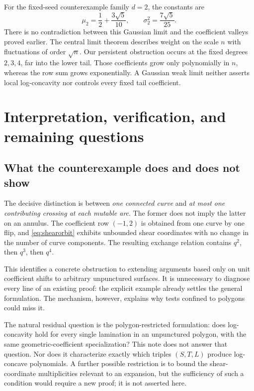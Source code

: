 \documentclass[11pt,letterpaper]{article}
\numberwithin{equation}{section}
\theoremstyle{definition}
\begin{document}
For the fixed-seed counterexample family $d=2$, the constants are
\[
 \mu_2=\frac12+\frac{3\sqrt5}{10},\qquad
 \sigma_2^2=\frac{7\sqrt5}{25}.
\]
There is no contradiction between this Gaussian limit and the coefficient
valleys proved earlier. The central limit theorem describes weight on the
scale $n$ with fluctuations of order $\sqrt n$. Our persistent obstruction
occurs at the fixed degrees $2,3,4$, far into the lower tail. Those
coefficients grow only polynomially in $n$, whereas the row sum grows
exponentially. A Gaussian weak limit neither asserts local log-concavity nor
controls every fixed tail coefficient.

\section{Interpretation, verification, and remaining questions}\label{sec:scope}

\subsection{What the counterexample does and does not show}

The decisive distinction is between \emph{one connected curve} and
\emph{at most one contributing crossing at each mutable arc}. The former does
not imply the latter on an annulus. The coefficient row $(-1,2)$ is obtained
from one curve by one flip, and \eqref{eq:shearorbit} exhibits unbounded shear
coordinates with no change in the number of curve components. The resulting
exchange relation contains $q^2$, then $q^3$, then $q^4$.

This identifies a concrete obstruction to extending arguments based only on
unit coefficient shifts to arbitrary unpunctured surfaces. It is unnecessary
to diagnose every line of an existing proof: the explicit example already
settles the general formulation. The mechanism, however, explains why tests
confined to polygons could miss it.

The natural residual question is the polygon-restricted formulation: does
log-concavity hold for every single lamination in an unpunctured polygon,
with the same geometric-coefficient specialization? This note does not answer
that question. Nor does it characterize exactly which triples $(S,T,L)$
produce log-concave polynomials. A further possible restriction is to bound
the shear-coordinate multiplicities relevant to an expansion, but the
sufficiency of such a condition would require a new proof; it is not asserted
here.
\end{document}
